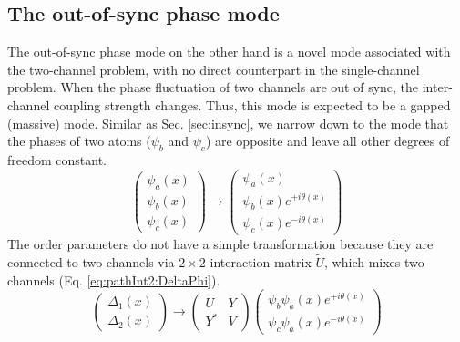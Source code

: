 \documentclass[reprint,pra]{revtex4-1}
\newcommand{\mtrx}[1]{\ensuremath{\begin{pmatrix}#1\end{pmatrix}}}
\newcommand{\av}[1]{\ensuremath{\bigl<{#1}\bigr>}}
\begin{document}
\subsection{The out-of-sync phase mode}



The out-of-sync phase mode on the other hand is a novel mode associated with the two-channel problem, with no direct counterpart in the single-channel problem.  
 When  the phase fluctuation of two channels are out of  sync,  the inter-channel coupling strength changes.  Thus, this mode is  expected to be  a gapped (massive) mode.  Similar as Sec. \ref{sec:insync}, we narrow down to the mode that the phases of two atoms  ($\psi_{b}$ and $\psi_{c}$) are opposite and leave all other degrees of freedom constant.  
\begin{equation*}
\mtrx{\psi_{a}(x)\\\psi_{b}(x)\\\psi_{c}(x)}\rightarrow{}
	\mtrx{\psi_{a}(x)\\\psi_{b}(x)e^{+i\theta(x)}\\\psi_{c}(x)e^{-i\theta(x)}}
\end{equation*}
The order parameters do not have a simple transformation because they are connected to two channels via $2\times2$ interaction matrix $\tilde{U}$, which mixes two channels (Eq. \ref{eq:pathInt2:DeltaPhi}).  
\begin{equation*}
\begin{pmatrix}\Delta_{1}(x)\\\Delta_{2}(x)\end{pmatrix}\rightarrow{}
	\mtrx{U&Y\\Y^{*}&V}\begin{pmatrix}\psi_{b}\psi_{a}(x)e^{+i\theta(x)}\\\psi_{c}\psi_{a}(x)e^{-i\theta(x)}\end{pmatrix}
\end{equation*}
\end{document}
